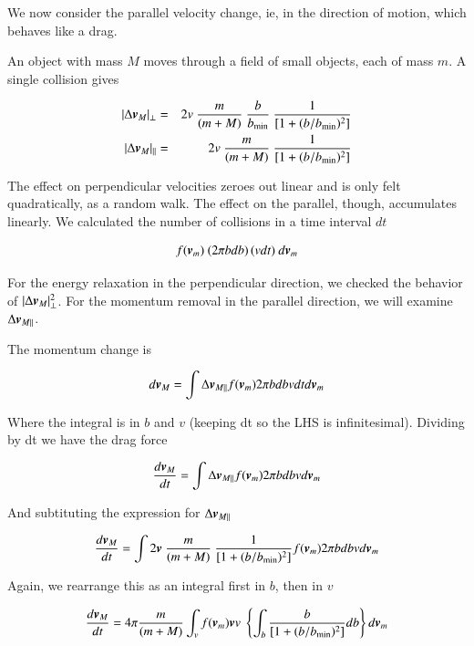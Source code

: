We now consider the parallel velocity change, ie, in the direction of motion, which behaves like a drag. 

An object with mass $M$ moves through a field of small objects, each of mass $m$. A single collision gives 

\begin{eqnarray}
|\Delta \v{v}_{M}|_\perp &=& 2v \ \frac{m}{(m+M)} \ \frac{b}{b_{\rm min}}\ \frac{1}{[1+(b/b_{\rm min})^2]}\\
|\Delta \v{v}_{M}|_{||} &=& 2v \ \frac{m}{(m+M)} \ \frac{1}{[1+(b/b_{\rm min})^2]}
\end{eqnarray}

The effect on perpendicular velocities zeroes out linear and is only felt quadratically, as a random walk. The effect on the parallel, though, accumulates linearly. We calculated the number of collisions in a time interval $dt$ 

\begin{equation}
f(\v{v}_m) \ (2\pi b db)\,(v dt) \ d\v{v}_m
\end{equation}


For the energy relaxation in the perpendicular direction, we checked the behavior of $|\Delta {\boldsymbol{v}}_{M}|_\perp^2$. For the momentum removal in the parallel direction, we will examine $\Delta {\boldsymbol{v}}_{{M}{||}}$.

The momentum change is

\begin{equation}
d{\boldsymbol{v}}_M = \int \Delta{\boldsymbol{v}}_{M{||}}f({\boldsymbol{v}}_m) 2\pi b db  v dt  d{\boldsymbol{v}}_m 
\end{equation}

Where the integral is in $b$ and $v$ (keeping dt so the LHS is infinitesimal). Dividing by dt we have the drag force 

\begin{equation}
\frac{d{\boldsymbol{v}}_M}{dt} = \int \Delta{\boldsymbol{v}}_{M{||}}f({\boldsymbol{v}}_m) 2\pi b db  v  d{\boldsymbol{v}}_m 
\end{equation}

And subtituting the expression for $\Delta{\boldsymbol{v}}_{M{||}}$

\begin{equation}
\frac{d\v{v}_M}{dt} = \int 2\v{v} \ \frac{m}{(m+M)} \ \frac{1}{[1+(b/b_{\rm min})^2]} f(\v{v}_m) 2\pi b db  v  d\v{v}_m 
\end{equation}

Again, we rearrange this as an integral first in $b$, then in $v$

\begin{equation}
\frac{d\v{v}_M}{dt} = 4\pi\frac{m}{(m+M)} \int_v f(\v{v}_m) \v{v} v  \ \left\{\int_b  \frac{b}{[1+(b/b_{\rm min})^2]}  db \right\}  d\v{v}_m 
\end{equation}

